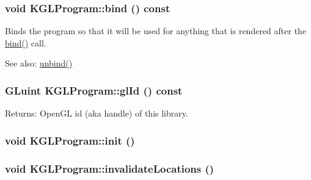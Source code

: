 \hypertarget{class_k_g_l_program_48756f0c04a768d2fef06d7ac3d29207}{
\subsubsection[{bind}]{\setlength{\rightskip}{0pt plus 5cm}void KGLProgram::bind () const}}
\label{class_k_g_l_program_48756f0c04a768d2fef06d7ac3d29207}


Binds the program so that it will be used for anything that is rendered after the \hyperlink{class_k_g_l_program_48756f0c04a768d2fef06d7ac3d29207}{bind()} call.

\begin{Desc}
\item[See also:]\hyperlink{class_k_g_l_program_a52890b41224848903a772049f374dc3}{unbind()} \end{Desc}
\hypertarget{class_k_g_l_program_7a9b4ef4da3e149386a50c8d4241b6c6}{
\subsubsection[{glId}]{\setlength{\rightskip}{0pt plus 5cm}GLuint KGLProgram::glId () const}}
\label{class_k_g_l_program_7a9b4ef4da3e149386a50c8d4241b6c6}


\begin{Desc}
\item[Returns:]OpenGL id (aka handle) of this library. \end{Desc}
\hypertarget{class_k_g_l_program_5c8081f85275e023d6bf034d54bd1721}{
\subsubsection[{init}]{\setlength{\rightskip}{0pt plus 5cm}void KGLProgram::init ()}}
\label{class_k_g_l_program_5c8081f85275e023d6bf034d54bd1721}


\hypertarget{class_k_g_l_program_949c83395eed27219fd984fe33ac9ecf}{
\subsubsection[{invalidateLocations}]{\setlength{\rightskip}{0pt plus 5cm}void KGLProgram::invalidateLocations ()}}
\label{class_k_g_l_program_949c83395eed27219fd984fe33ac9ecf}


